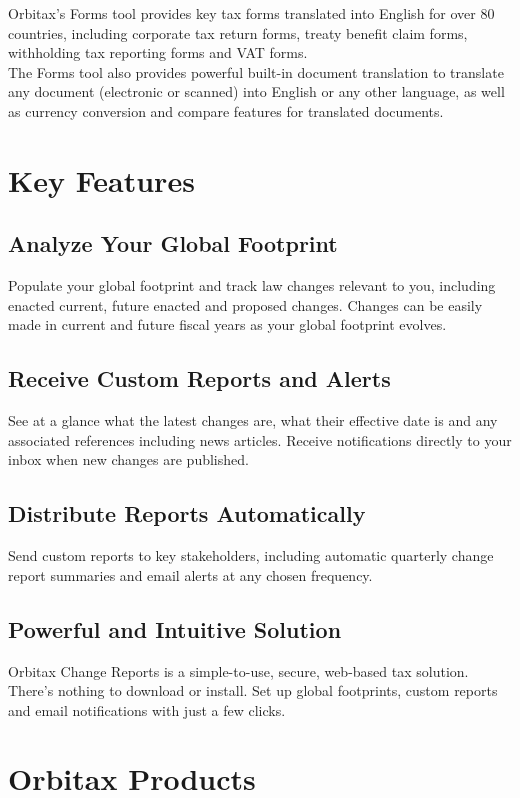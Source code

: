\begin{flushleft}
Orbitax's Forms tool provides key tax forms translated into English for over 80 countries, including corporate tax return forms, treaty benefit claim forms, withholding tax reporting forms and VAT forms. \\
The Forms tool also provides powerful built-in document translation to translate any document (electronic or scanned) into English or any other language, as well as currency conversion and compare features for translated documents.


\section{Key Features}


\subsection{Analyze Your Global Footprint}
Populate your global footprint and track law changes relevant to you, including enacted current, future enacted and proposed changes. Changes can be easily made in current and future fiscal years as your global footprint evolves.

\subsection{Receive Custom Reports and Alerts}
See at a glance what the latest changes are, what their effective date is and any associated references including news articles. Receive notifications directly to your inbox when new changes are published.


\subsection{Distribute Reports Automatically}
Send custom reports to key stakeholders, including automatic quarterly change report summaries and email alerts at any chosen frequency.

\subsection{Powerful and Intuitive Solution}
Orbitax Change Reports is a simple-to-use, secure, web-based tax solution. There's nothing to download or install. Set up global footprints, custom reports and email notifications with just a few clicks.


\section{Orbitax Products}

\end{flushleft}
